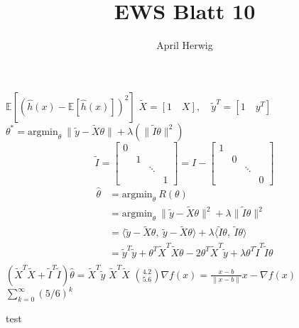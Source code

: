 \documentclass[draft]{article}
\title{EWS Blatt 10}
\author{April Herwig}
\begin{document}
\maketitle

$\mathbb{E}\left[ \left( \hat{h}(x) - \mathbb{E}\left[ \hat{h}(x) \right] \right) ^2 \right]$
$ \tilde{X} = [1\quad X], \quad\tilde{y}^T = [1\quad y^T] $
$ \theta ^{*} = \text{argmin}_\theta\  \| \tilde{y} - \tilde{X}\theta \| + \lambda\left(\| \tilde{I}\theta \|^2 \right)  $
\[
    \tilde{I}=\begin{bmatrix}
        0 & & & \\
        & 1 & & \\
        & & \ddots & \\
        & & & 1
    \end{bmatrix} = I - \begin{bmatrix}
        1 & & & \\
        & 0 & & \\
        & & \ddots & \\
        & & & 0 
    \end{bmatrix}
\]
\begin{align*}
    \hat{\theta} &= \text{argmin}_\theta\ R(\theta) \\
    &= \text{argmin}_\theta\ \| \tilde{y} - \tilde{X}\theta \|^2 + \lambda\| \tilde{I}\theta \| ^2 \\
    &= \langle \tilde{y} - \tilde{X}\theta,\ \tilde{y} - \tilde{X}\theta \rangle + \lambda\langle\tilde{I}\theta,\ \tilde{I}\theta\rangle \\
    &= \tilde{y}^T \tilde{y} +\theta^T\tilde{X}^T\tilde{X}\theta - 2\theta^T\tilde{X}^T\tilde{y} + \lambda\theta^T\tilde{I}^T\tilde{I}\theta \\
\end{align*}
$ \left(\tilde{X}^T\tilde{X} + \tilde{I}^T\tilde{I}\right)\hat{\theta} = \tilde{X}^T\tilde{y} $
$ \tilde{X}^T\tilde{X} $
$ \binom{4.2}{5.6}  \nabla f(x) = \frac{x - b}{\| x - b \|} x - \nabla f(x) $
$ \sum_{k = 0}^{\infty} (5/6)^k  $

\begin{verbatim*}
    test
\end{verbatim*}
\end{document}
